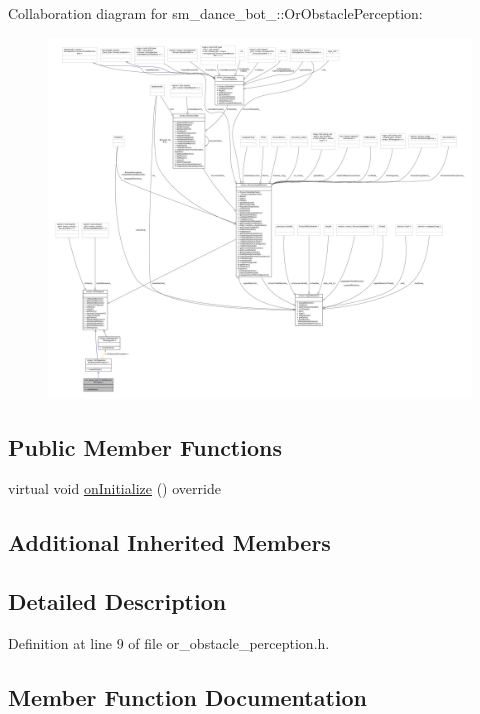 Collaboration diagram for sm\+\_\+dance\+\_\+bot\+\_\+:\+:Or\+Obstacle\+Perception\+:
\nopagebreak
\begin{figure}[H]
\begin{center}
\leavevmode
\includegraphics[width=350pt]{classsm__dance__bot__3_1_1OrObstaclePerception__coll__graph}
\end{center}
\end{figure}
\subsection*{Public Member Functions}
\begin{DoxyCompactItemize}
\item 
virtual void \hyperlink{classsm__dance__bot__3_1_1OrObstaclePerception_a06084ec8657c09b4ea650d6242ba0d61}{on\+Initialize} () override
\end{DoxyCompactItemize}
\subsection*{Additional Inherited Members}


\subsection{Detailed Description}


Definition at line 9 of file or\+\_\+obstacle\+\_\+perception.\+h.



\subsection{Member Function Documentation}
